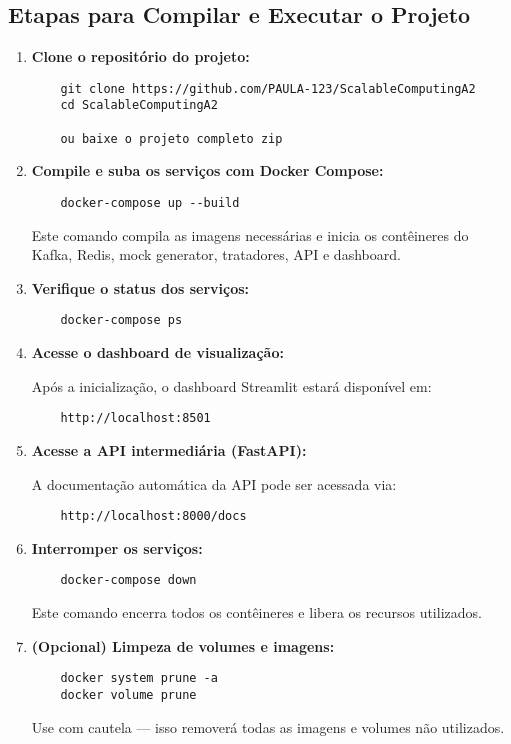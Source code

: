 \documentclass[a4paper,12pt]{article}
\begin{document}
\subsection*{Etapas para Compilar e Executar o Projeto}

\begin{enumerate}
    \item \textbf{Clone o repositório do projeto:}
    \begin{verbatim}
    git clone https://github.com/PAULA-123/ScalableComputingA2
    cd ScalableComputingA2

    ou baixe o projeto completo zip
    \end{verbatim}

    \item \textbf{Compile e suba os serviços com Docker Compose:}
    \begin{verbatim}
    docker-compose up --build
    \end{verbatim}

    Este comando compila as imagens necessárias e inicia os contêineres do Kafka, Redis, mock generator, tratadores, API e dashboard.

    \item \textbf{Verifique o status dos serviços:}
    \begin{verbatim}
    docker-compose ps
    \end{verbatim}

    \item \textbf{Acesse o dashboard de visualização:}

    Após a inicialização, o dashboard Streamlit estará disponível em:
    \begin{verbatim}
    http://localhost:8501
    \end{verbatim}

    \item \textbf{Acesse a API intermediária (FastAPI):}

    A documentação automática da API pode ser acessada via:
    \begin{verbatim}
    http://localhost:8000/docs
    \end{verbatim}

    \item \textbf{Interromper os serviços:}
    \begin{verbatim}
    docker-compose down
    \end{verbatim}

    Este comando encerra todos os contêineres e libera os recursos utilizados.

    \item \textbf{(Opcional) Limpeza de volumes e imagens:}
    \begin{verbatim}
    docker system prune -a
    docker volume prune
    \end{verbatim}
    Use com cautela — isso removerá todas as imagens e volumes não utilizados.
\end{enumerate}
\end{document}
